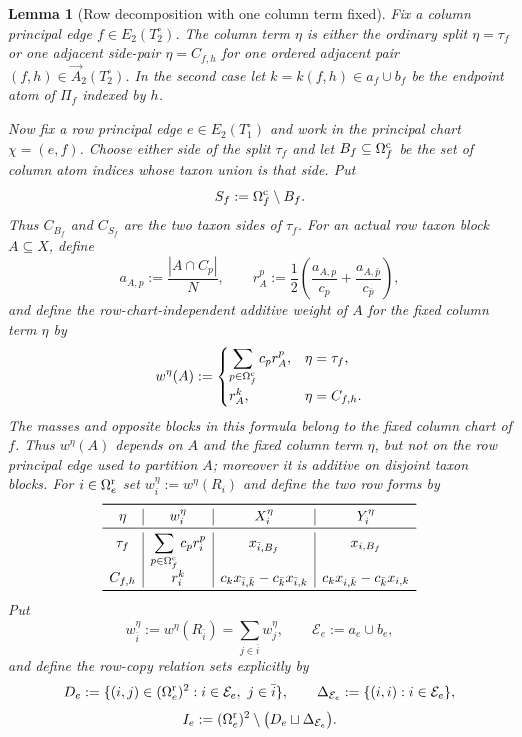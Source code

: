 \documentclass[11pt]{article}
\newtheorem{lemma}[theorem]{Lemma}
\begin{document}
\begin{lemma}[Row decomposition with one column term fixed]
\label{lem:occurrence-row-settlement}
Fix a column principal edge $f\in E_2(T_2^\circ)$.  The column term $\eta$
is either the ordinary split $\eta=\tau_f$ or one adjacent side-pair
$\eta=C_{f,h}$ for one ordered adjacent pair
$(f,h)\in\overrightarrow A_2(T_2^\circ)$.  In the second case let
$k=k(f,h)\in a_f\cup b_f$ be the endpoint atom of $\Pi_f$ indexed by $h$.

Now fix a row principal edge $e\in E_2(T_1^\circ)$ and work in the
principal chart $\chi=(e,f)$.  Choose either side of the split $\tau_f$ and
let $B_f\subseteq\Omega_f^{\rm c}$ be the set of column atom indices whose
taxon union is that side.  Put
\[
 S_f:=\Omega_f^{\rm c}\setminus B_f.
\]
Thus $C_{B_f}$ and $C_{S_f}$ are the two taxon sides of $\tau_f$.  For
an actual row taxon block $A\subseteq X$, define
\[
a_{A,p}:=\frac{|A\cap C_p|}{N},
\qquad
r_A^p:=\frac12\left(
\frac{a_{A,p}}{c_p}+\frac{a_{A,\bar p}}{c_{\bar p}}
\right),
\]
and define the row-chart-independent additive weight of $A$ for the fixed
column term $\eta$ by
\[
w^\eta(A):=
\begin{cases}
\displaystyle\sum_{p\in\Omega_f^{\rm c}}c_pr_A^p,
  &\eta=\tau_f,\\[2mm]
r_A^k,&\eta=C_{f,h}.
\end{cases}
\]
The masses and opposite blocks in this formula belong to the fixed column
chart of $f$.  Thus $w^\eta(A)$ depends on $A$ and the fixed column term
$\eta$, but not on the row principal edge used to partition $A$; moreover it
is additive on disjoint taxon blocks.  For $i\in\Omega_e^{\rm r}$ set
$w_i^\eta:=w^\eta(R_i)$ and define the two row forms by
\[
\begin{array}{c|c|c|c}
\toprule
\eta&w_i^\eta&X_i^\eta&Y_i^\eta\\
\midrule
\tau_f&
\displaystyle\sum_{p\in\Omega_f^{\rm c}}c_pr_i^p&
x_{\bar i,B_f}&x_{i,B_f}\\[1mm]
C_{f,h}&r_i^k&
c_kx_{\bar i,\bar k}-c_{\bar k}x_{\bar i,k}&
c_kx_{i,\bar k}-c_{\bar k}x_{i,k}\\
\bottomrule
\end{array}
\]
Put
\[
 w_{\bar i}^\eta:=w^\eta(R_{\bar i})
 =\sum_{j\in\bar i}w_j^\eta,
 \qquad
 \mathcal E_e:=a_e\cup b_e,
\]
and define the row-copy relation sets explicitly by
\[
 D_e:=\{(i,j)\in(\Omega_e^{\rm r})^2:
             i\in\mathcal E_e,\ j\in\bar i\},
 \qquad
 \Delta_{\mathcal E_e}:=\{(i,i):i\in\mathcal E_e\},
\]
\[
 I_e:=(\Omega_e^{\rm r})^2
       \setminus\bigl(D_e\sqcup\Delta_{\mathcal E_e}\bigr).
\]
\end{lemma}
\end{document}
